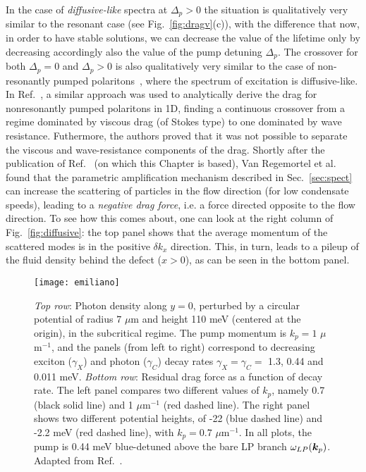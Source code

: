 In the case of \emph{diffusive-like} spectra at $\Delta_p>0$ the
situation is qualitatively very similar to the resonant case (see
Fig.~\ref{fig:dragv}(c)), with the difference that now, in order to
have stable solutions, we can decrease the value of the lifetime only
by decreasing accordingly also the value of the pump detuning
$\Delta_p$. The crossover for both $\Delta_p = 0$ and $\Delta_p > 0$
is also qualitatively very similar to the case of non-resonantly
pumped polaritons~\cite{Wouters_2010}, where the spectrum of
excitation is diffusive-like. In Ref.~\cite{Larr__2012}, a similar
approach was used to analytically derive the drag for nonresonantly
pumped polaritons in 1D, finding a continuous crossover from a regime
dominated by viscous drag (of Stokes type) to one dominated by wave
resistance. Futhermore, the authors proved that it was not possible to
separate the viscous and wave-resistance components of the drag.
Shortly after the publication of Ref.~\cite{Berceanu_2012} (on which
this Chapter is based), Van Regemortel et
al.~\cite{Van_Regemortel_2014} found that the parametric amplification
mechanism described in Sec.~\ref{sec:spect} can increase the
scattering of particles in the flow direction (for low condensate
speeds), leading to a \emph{negative drag force}, i.e. a force
directed opposite to the flow direction. To see how this comes about,
one can look at the right column of Fig.~\ref{fig:diffusive}: the top
panel shows that the average momentum of the scattered modes is in the
positive $\delta k_x$ direction. This, in turn, leads to a pileup of
the fluid density behind the defect ($x > 0$), as can be seen in the
bottom panel.

\begin{figure}[tb]\centering
  \texttt{[image: emiliano]}
  \caption{
    \emph{Top row}: Photon density along $y=0$, perturbed by a
    circular potential of radius $7$ $\mu$m and height 110 meV (centered
    at the origin), in the subcritical regime. The pump momentum is $k_p =
    1$ $\mu$m${}^{-1}$, and the panels (from left to right) correspond to
    decreasing exciton ($\gamma_X$) and photon ($\gamma_C$) decay rates
    $\gamma_X = \gamma_C =$ 1.3, 0.44 and 0.011 meV. 
    \emph{Bottom row}: Residual drag force as a function of decay
    rate. The left panel compares two different values of $k_p$, namely
    0.7 (black solid line) and 1 $\mu$m${}^{-1}$ (red dashed line). The
    right panel shows two different potential heights, of -22 (blue
    dashed line) and -2.2 meV (red dashed line), with $k_p = 0.7$
    $\mu$m${}^{-1}$.
    In all plots, the pump is 0.44 meV blue-detuned above the bare LP
    branch $\omega_{LP}(\bm{k}_{p})$. Adapted from
    Ref.~\cite{Cancellieri_2010}.
  }\label{fig:emiliano}
\end{figure}

